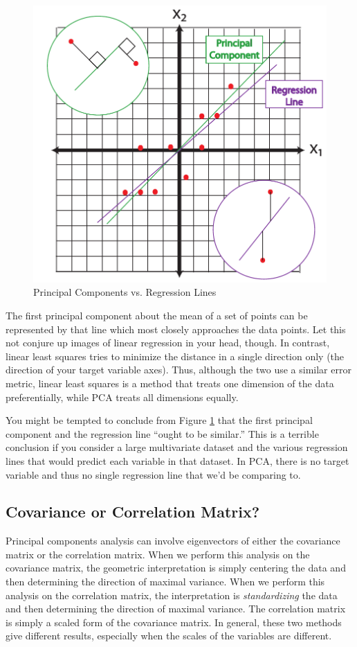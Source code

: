 \documentclass[
]{article}
\theoremstyle{definition}
\theoremstyle{definition}
\theoremstyle{definition}
\theoremstyle{definition}
\theoremstyle{remark}
\begin{document}
\begin{figure}
 
 {\centering \includegraphics[width=0.6\linewidth]{figs/pcvsreg} 
 
 }
 
 \caption{Principal Components vs. Regression Lines}\label{fig:pcvsreg}
 \end{figure}

The first principal component about the mean of a set of points can be represented by that line which most closely approaches the data points. Let this not conjure up images of linear regression in your head, though. In contrast, linear least squares tries to minimize the distance in a single direction only (the direction of your target variable axes). Thus, although the two use a similar error metric, linear least squares is a method that treats one dimension of the data preferentially, while PCA treats all dimensions equally.

You might be tempted to conclude from Figure \ref{fig:pcvsreg} that the first principal component and the regression line ``ought to be similar.'' This is a terrible conclusion if you consider a large multivariate dataset and the various regression lines that would predict each variable in that dataset. In PCA, there is no target variable and thus no single regression line that we'd be comparing to.

\hypertarget{covariance-or-correlation-matrix}{%
\subsection{Covariance or Correlation Matrix?}\label{covariance-or-correlation-matrix}}

Principal components analysis can involve eigenvectors of either the covariance matrix or the correlation matrix. When we perform this analysis on the covariance matrix, the geometric interpretation is simply centering the data and then determining the direction of maximal variance. When we perform this analysis on the correlation matrix, the interpretation is \emph{standardizing} the data and then determining the direction of maximal variance. The correlation matrix is simply a scaled form of the covariance matrix. In general, these two methods give different results, especially when the scales of the variables are different.
\end{document}
